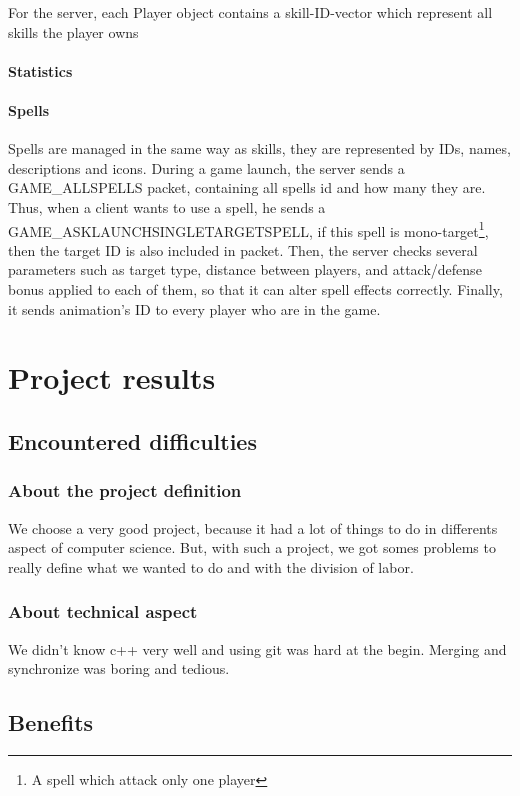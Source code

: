 \documentclass{scrreprt}
\begin{document}
					For the server, each Player object contains a skill-ID-vector which represent all skills the player owns %

					\subsection{Statistics}

					\subsection{Spells}
					Spells are managed in the same way as skills, they are represented by IDs, names, descriptions and icons. During a game launch, the server sends a GAME\_ALLSPELLS packet, containing all spells id and how many they are. Thus, when a client wants to use a spell, he sends a GAME\_ASKLAUNCHSINGLETARGETSPELL, if this spell is mono-target\footnote{A spell which attack only one player}, then the target ID is also included in packet. Then, the server checks several parameters such as target type, distance between players, and attack/defense bonus applied to each of them, so that it can alter spell effects correctly. Finally, it sends animation's ID to every player who are in the game.

					\part{Project results}
					\chapter{Encountered difficulties}
					\section{About the project definition}
					We choose a very good project, because it had a lot of things to do in differents aspect of computer science. But, with such a project, we got somes problems to really define what we wanted to do and with the division of labor.
					\section{About technical aspect}
					We didn't know c++ very well and using git was hard at the begin. Merging and synchronize was boring and tedious.
					\chapter{Benefits}
\end{document}
